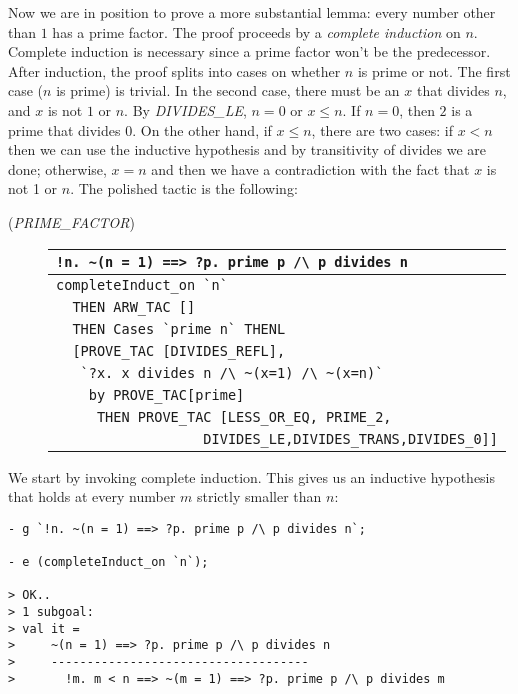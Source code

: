 Now we are in position to prove a more substantial lemma: every number
other than $1$ has a prime factor. The proof proceeds by a
\emph{complete induction} on $n$. Complete induction is
necessary since a prime factor won't be the predecessor. After
induction, the proof splits into cases on whether $n$ is prime or
not. The first case ($n$ is prime) is
trivial. In the second case, there must be an $x$ that divides $n$, and
$x$ is not $1$ or $n$. By {\small\it DIVIDES\_LE}, $n=0$ or $x \leq n$. If
$n=0$, then $2$ is a prime that divides $0$. On the other hand, if $x \leq
n$, there are two cases: if $x < n$ then we can use the inductive
hypothesis and by transitivity of divides we are done; otherwise,
$x=n$ and then we have a contradiction with the fact that $x$ is not 1
or $n$.  The polished tactic is the following:
\begin{description}
\item [\small{({\it PRIME\_FACTOR\/})}]
\begin{tabular}[t]{l}
\verb+!n. ~(n = 1) ==> ?p. prime p /\ p divides n+ \\ \hline
\verb+completeInduct_on `n`+ \\
\verb+  THEN ARW_TAC []+ \\
\verb+  THEN Cases `prime n` THENL+ \\
\verb+  [PROVE_TAC [DIVIDES_REFL], + \\
\verb+   `?x. x divides n /\ ~(x=1) /\ ~(x=n)` + \\
\verb+    by PROVE_TAC[prime]+ \\
\verb+     THEN PROVE_TAC [LESS_OR_EQ, PRIME_2, +\\
\verb+                  DIVIDES_LE,DIVIDES_TRANS,DIVIDES_0]]+ \\
\end{tabular}
\end{description}
We start by invoking complete induction. This gives us an inductive
hypothesis that holds at every number $m$ strictly smaller than $n$:
\begin{session}\begin{verbatim}
- g `!n. ~(n = 1) ==> ?p. prime p /\ p divides n`;

- e (completeInduct_on `n`);

> OK..
> 1 subgoal:
> val it =
>     ~(n = 1) ==> ?p. prime p /\ p divides n
>     ------------------------------------
>       !m. m < n ==> ~(m = 1) ==> ?p. prime p /\ p divides m
\end{verbatim}\end{session}
